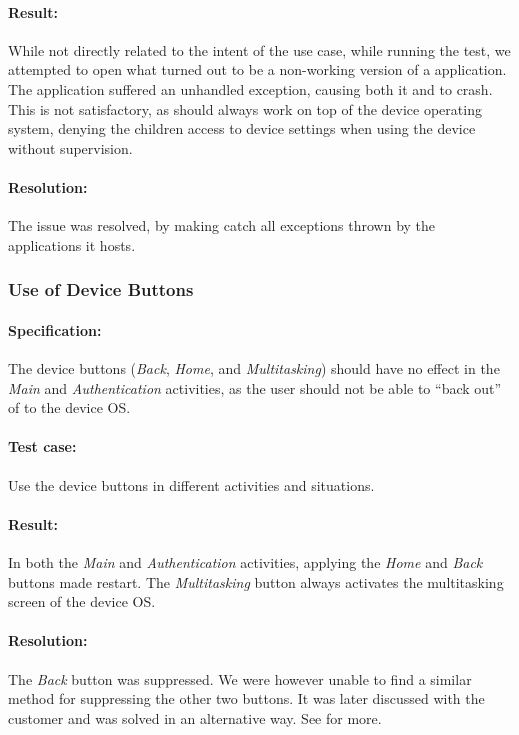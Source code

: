 \paragraph{Result:} While not directly related to the intent of the use case, while running the test, we attempted to open what turned out to be a non-working version of a \giraf application. The application suffered an unhandled exception, causing both it and \launcher to crash. This is not satisfactory, as \launcher should always work on top of the device operating system, denying the children access to device settings when using the device without supervision.
\paragraph{Resolution:} The issue was resolved, by making \launcher catch all exceptions thrown by the \giraf applications it hosts.


\subsubsection{Use of Device Buttons}

\paragraph{Specification:} The device buttons (\textit{Back}, \textit{Home}, and \textit{Multitasking}) should have no effect in the \textit{Main} and \textit{Authentication} activities, as the user should not be able to ``back out'' of \launcher to the device OS.
\paragraph{Test case:} Use the device buttons in different activities and situations.
\paragraph{Result:} In both the \textit{Main} and \textit{Authentication} activities, applying the \textit{Home} and \textit{Back} buttons made \launcher restart. The \textit{Multitasking} button always activates the multitasking screen of the device OS.
\paragraph{Resolution:} The \textit{Back} button was suppressed. We were however unable to find a similar method for suppressing the other two buttons. 
It was later discussed with the customer and was solved in an alternative way.
See  for more.